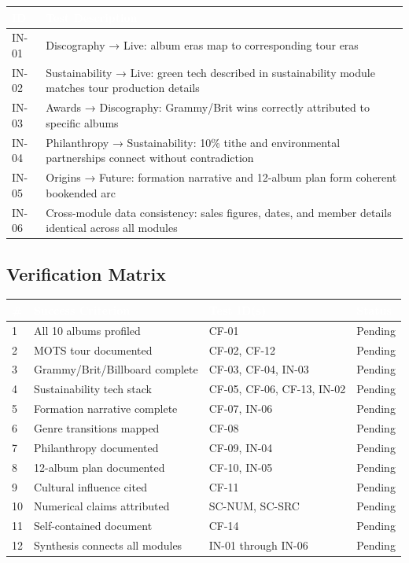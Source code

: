 \documentclass[11pt,letterpaper]{article}
\newcommand{\tableheader}[1]{\textbf{\sffamily\textcolor{white}{#1}}}
\begin{document}
\begin{center}
\begin{tabularx}{\textwidth}{C{1.2cm}X}
\toprule
{}
\tableheader{ID} & \tableheader{Test Description} \\
\midrule
IN-01 & Discography → Live: album eras map to corresponding tour eras \\
IN-02 & Sustainability → Live: green tech described in sustainability module matches tour production details \\
IN-03 & Awards → Discography: Grammy/Brit wins correctly attributed to specific albums \\
IN-04 & Philanthropy → Sustainability: 10\% tithe and environmental partnerships connect without contradiction \\
IN-05 & Origins → Future: formation narrative and 12-album plan form coherent bookended arc \\
IN-06 & Cross-module data consistency: sales figures, dates, and member details identical across all modules \\
\bottomrule
\end{tabularx}
\end{center}

\subsection{Verification Matrix}

\begin{center}
\begin{tabularx}{\textwidth}{C{0.5cm}XL{3cm}C{1.5cm}}
\toprule
{}
\tableheader{\#} & \tableheader{Success Criterion} & \tableheader{Test ID(s)} & \tableheader{Status} \\
 & All 10 albums profiled & CF-01 & Pending \\
2 & MOTS tour documented & CF-02, CF-12 & Pending \\
3 & Grammy/Brit/Billboard complete & CF-03, CF-04, IN-03 & Pending \\
4 & Sustainability tech stack & CF-05, CF-06, CF-13, IN-02 & Pending \\
5 & Formation narrative complete & CF-07, IN-06 & Pending \\
6 & Genre transitions mapped & CF-08 & Pending \\
7 & Philanthropy documented & CF-09, IN-04 & Pending \\
8 & 12-album plan documented & CF-10, IN-05 & Pending \\
9 & Cultural influence cited & CF-11 & Pending \\
10 & Numerical claims attributed & SC-NUM, SC-SRC & Pending \\
11 & Self-contained document & CF-14 & Pending \\
12 & Synthesis connects all modules & IN-01 through IN-06 & Pending \\
\bottomrule
\end{tabularx}
\end{center}
\end{document}
